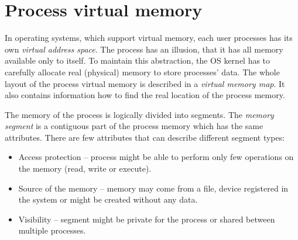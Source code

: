 \section{Process virtual memory}

In operating systems, which support virtual memory, each user processes has its own {\it virtual address space}.
The process has an illusion, that it has all memory available only to itself.
To maintain this abstraction, the OS kernel has to carefully allocate real (physical) memory to store processes' data.
The whole layout of the process virtual memory is described in a {\it virtual memory map}.
It also contains information how to find the real location of the process memory.

The memory of the process is logically divided into segments.
The {\it memory segment} is a contiguous part of the process memory which has the same attributes.
There are few attributes that can describe different segment types:
\begin{itemize}
  \item Access protection -- process might be able to perform only few operations on the memory (read, write or execute).
  \item Source of the memory -- memory may come from a file, device registered in the system or might be created without any data.
  \item Visibility -- segment might be private for the process or shared between multiple processes.
\end{itemize}

%
%

